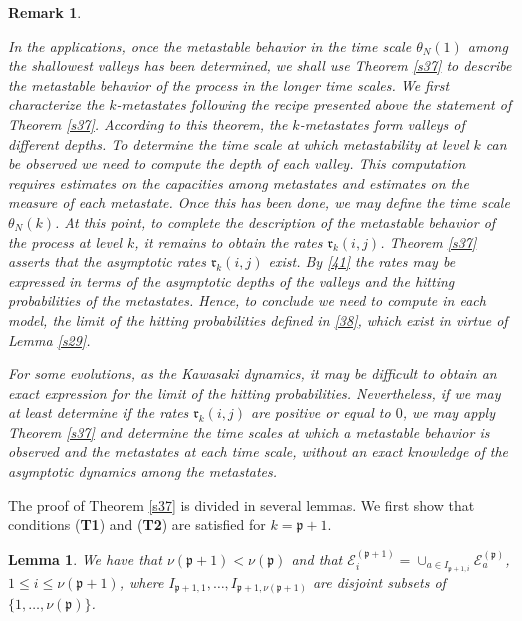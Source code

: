\documentclass[reqno]{amsart}
\newtheorem{lemma}[theorem]{Lemma}
\newtheorem{remark}[theorem]{Remark}
\begin{document}
\begin{remark}
\label{s38}
{\rm In the applications, once the metastable behavior in the time
scale $\theta_N(1)$ among the shallowest valleys has been determined,
we shall use Theorem \ref{s37} to describe the metastable behavior of
the process in the longer time scales. We first characterize the
$k$-metastates following the recipe presented above the statement of
Theorem \ref{s37}. According to this theorem, the $k$-metastates form
valleys of different depths. To determine the time scale at which
metastability at level $k$ can be observed we need to compute the
depth of each valley. This computation requires estimates on the
capacities among metastates and estimates on the measure of each
metastate. Once this has been done, we may define the time scale
$\theta_N(k)$. At this point, to complete the description of the
metastable behavior of the process at level $k$, it remains to obtain
the rates ${{\mathfrak r}}_k(i,j)$. Theorem \ref{s37} asserts that the
asymptotic rates ${{\mathfrak r}}_k(i,j)$ exist. By \eqref{41} the rates may be
expressed in terms of the asymptotic depths of the valleys and the
hitting probabilities of the metastates. Hence, to conclude we need to
compute in each model, the limit of the hitting probabilities defined
in \eqref{38}, which exist in virtue of Lemma \ref{s29}.

For some evolutions, as the Kawasaki dynamics, it may be difficult to
obtain an exact expression for the limit of the hitting
probabilities. Nevertheless, if we may at least determine if the rates
${{\mathfrak r}}_k(i,j)$ are positive or equal to $0$, we may apply Theorem
\ref{s37} and determine the time scales at which a metastable behavior
is observed and the metastates at each time scale, without an exact
knowledge of the asymptotic dynamics among the metastates. }
\end{remark}

The proof of Theorem \ref{s37} is divided in several lemmas.  We first
show that conditions ({\bf T1}) and ({\bf T2}) are satisfied for
$k={{\mathfrak p}}+1$.

\begin{lemma}
\label{s33}
We have that $\nu({{\mathfrak p}}+1)<\nu({{\mathfrak p}})$ and that ${{\mathcal E}}^{({{\mathfrak p}}+1)}_i =
\cup_{a\in I_{{{\mathfrak p}}+1,i}} {{\mathcal E}}^{({{\mathfrak p}})}_a$, $1\le i\le \nu({{\mathfrak p}}+1)$, where $I_{{{\mathfrak p}}+1,1}, \dots, I_{{{\mathfrak p}}+1,\nu({{\mathfrak p}}+1)}$ are
disjoint subsets of $\{1, \dots, \nu({{\mathfrak p}})\}$.
\end{lemma}
\end{document}
